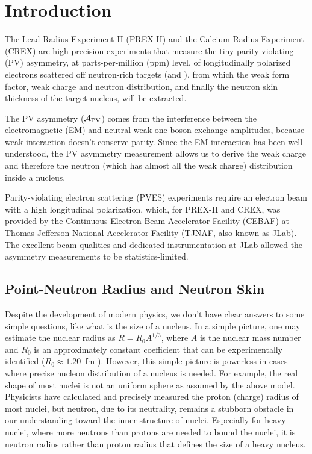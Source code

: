 \chapter{Introduction}
The Lead Radius Experiment-II (PREX-II) and the Calcium Radius Experiment (CREX) are 
high-precision experiments that measure the tiny parity-violating (PV) asymmetry,
at parts-per-million (ppm) level, of longitudinally polarized electrons scattered 
off neutron-rich targets (\Pb and \Ca), from which the weak form factor, weak
charge and neutron distribution, and finally the
neutron skin thickness of the target nucleus, will be extracted.

The PV asymmetry ($\mathcal{A}_{\text{PV}}$) comes from the interference between the 
electromagnetic (EM) and neutral weak one-boson exchange amplitudes, because weak 
interaction doesn't conserve parity. Since the EM 
interaction has been well understood, the PV asymmetry measurement allows 
us to derive the weak charge and therefore the neutron (which has almost all the 
weak charge) distribution inside a nucleus.

Parity-violating electron scattering (PVES) experiments require %
an electron beam with a high longitudinal polarization, which, for PREX-II and CREX,
was provided by the  Continuous Electron Beam Accelerator Facility (CEBAF) 
at Thomas Jefferson National Accelerator Facility (TJNAF, also known as JLab). 
The excellent beam qualities and dedicated instrumentation at JLab allowed 
the asymmetry measurements to be statistics-limited.

\section{Point-Neutron Radius and Neutron Skin}
Despite the development of modern physics, we don't have clear answers to some
simple questions, like what is the size of a nucleus.
In a simple picture, one may estimate the nuclear radius as $R = R_0 A^{1/3}$, 
where $A$ is the nuclear mass number 
and $R_0$ is an approximately constant coefficient that can be experimentally 
identified ($R_0 \approx 1.20$~fm \cite{ROYER2008105}). However, this simple picture is powerless
in cases where precise nucleon distribution of a nucleus is needed. 
For example, the real shape of most nuclei is not an uniform sphere as assumed by the above model.
Physicists have calculated and precisely measured the proton (charge) radius of most nuclei,
but neutron, due to its neutrality, remains a stubborn obstacle in 
our understanding toward the inner structure of nuclei. Especially for heavy nuclei,
where more neutrons than protons are needed to bound the nuclei, it is neutron
radius rather than proton radius that defines the size of a heavy nucleus.

